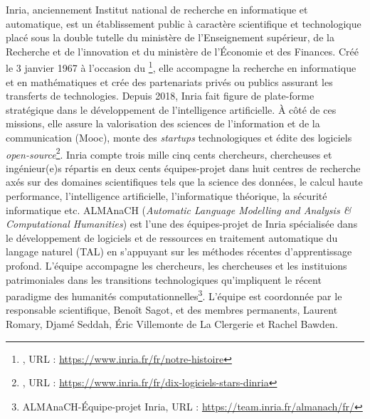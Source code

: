 Inria, anciennement Institut national de recherche en informatique et automatique, est un établissement public à caractère scientifique et technologique placé sous la double tutelle du ministère de l'Enseignement supérieur, de la Recherche et de l'innovation et du ministère de l'Économie et des Finances. Créé le 3 janvier 1967 à l'occasion du \footnote{, URL : \url{https://www.inria.fr/fr/notre-histoire}}, elle accompagne la recherche en informatique et en mathématiques et crée des partenariats privés ou publics assurant les transferts de technologies. Depuis 2018, Inria fait figure de plate-forme stratégique dans le développement de l'intelligence artificielle. À côté de ces missions, elle assure la valorisation des sciences de l'information et de la communication (Mooc), monte des \textit{startups} technologiques et édite des logiciels \textit{open-source}\footnote{, URL : \url{https://www.inria.fr/fr/dix-logiciels-stars-dinria}}. Inria compte trois mille cinq cents chercheurs, chercheuses et ingénieur(e)s répartis en deux cents équipes-projet dans huit centres de recherche axés sur des domaines scientifiques tels que la science des données, le calcul haute performance, l'intelligence artificielle, l'informatique théorique, la sécurité informatique etc.  ALMAnaCH (\textit{Automatic Language Modelling and Analysis \& Computational Humanities}) est l'une des équipes-projet de Inria spécialisée dans le développement de logiciels et de ressources en traitement automatique du langage naturel (TAL) en s'appuyant sur les méthodes récentes d'apprentissage profond. L'équipe accompagne les chercheurs, les chercheuses et les instituions patrimoniales dans les transitions technologiques qu'impliquent le récent paradigme des humanités computationnelles\footnote{ALMAnaCH-Équipe-projet Inria, URL : \url{https://team.inria.fr/almanach/fr/}}. L'équipe est coordonnée par le responsable scientifique, Benoît Sagot, et des membres permanents, Laurent Romary, Djamé Seddah, Éric Villemonte de La Clergerie et Rachel Bawden.\\


